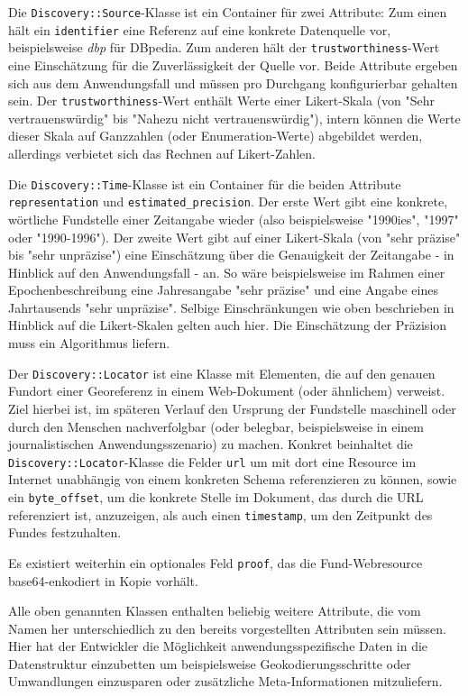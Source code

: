 Die \texttt{Discovery::Source}-Klasse ist ein Container für zwei Attribute: Zum einen hält ein \texttt{identifier} eine Referenz auf eine konkrete Datenquelle vor, beispielsweise \textit{dbp} für DBpedia. Zum anderen hält der \texttt{trustworthiness}-Wert eine Einschätzung für die Zuverlässigkeit der Quelle vor. Beide Attribute ergeben sich aus dem Anwendungsfall und müssen pro Durchgang konfigurierbar gehalten sein. Der \texttt{trustworthiness}-Wert enthält Werte einer Likert-Skala (von "Sehr vertrauenswürdig" bis "Nahezu nicht vertrauenswürdig"), intern können die Werte dieser Skala auf Ganzzahlen (oder Enumeration-Werte) abgebildet werden, allerdings verbietet sich das Rechnen auf Likert-Zahlen.

Die \texttt{Discovery::Time}-Klasse ist ein Container für die beiden Attribute \texttt{representation} und \texttt{estimated\_precision}. Der erste Wert gibt eine konkrete, wörtliche Fundstelle einer Zeitangabe wieder (also beispielsweise "1990ies", "1997" oder "1990-1996"). Der zweite Wert gibt auf einer Likert-Skala (von "sehr präzise" bis "sehr unpräzise") eine Einschätzung über die Genauigkeit der Zeitangabe - in Hinblick auf den Anwendungsfall - an. So wäre beispielsweise im Rahmen einer Epochenbeschreibung eine Jahresangabe "sehr präzise" und eine Angabe eines Jahrtausends "sehr unpräzise". Selbige Einschränkungen wie oben beschrieben in Hinblick auf die Likert-Skalen gelten auch hier. Die Einschätzung der Präzision muss ein Algorithmus liefern.

Der \texttt{Discovery::Locator} ist eine Klasse mit Elementen, die auf den genauen Fundort einer Georeferenz in einem Web-Dokument (oder ähnlichem) verweist. Ziel hierbei ist, im späteren Verlauf den Ursprung der Fundstelle maschinell oder durch den Menschen nachverfolgbar (oder belegbar, beispielsweise in einem journalistischen Anwendungsszenario) zu machen. Konkret beinhaltet die \texttt{Discovery::Locator}-Klasse die Felder \texttt{url} um mit dort eine Resource im Internet unabhängig von einem konkreten Schema referenzieren zu können, sowie ein \texttt{byte\_offset}, um die konkrete Stelle im Dokument, das durch die URL referenziert ist, anzuzeigen, als auch einen \texttt{timestamp}, um den Zeitpunkt des Fundes festzuhalten.
  
Es existiert weiterhin ein optionales Feld \texttt{proof}, das die Fund-Webresource base64-enkodiert in Kopie vorhält.

Alle oben genannten Klassen enthalten beliebig weitere Attribute, die vom Namen her unterschiedlich zu den bereits vorgestellten Attributen sein müssen. Hier hat der Entwickler die Möglichkeit anwendungsspezifische Daten in die Datenstruktur einzubetten um beispielsweise Geokodierungsschritte oder Umwandlungen einzusparen oder zusätzliche Meta-Informationen mitzuliefern.

